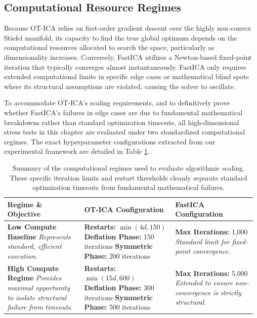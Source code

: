 \documentclass[12pt,a4paper,twoside,openany]{book}
\begin{document}
\subsection{Computational Resource Regimes}
Because OT-ICA relies on first-order gradient descent over the highly non-convex Stiefel manifold, its capacity to find 
the true global optimum depends on the computational resources allocated to search the space, particularly as dimensionality increases. 
Conversely, FastICA utilizes a Newton-based fixed-point iteration that typically converges almost instantaneously. 
FastICA only requires extended computational limits in specific edge cases or mathematical blind spots where its structural assumptions are violated, 
causing the solver to oscillate. 

To accommodate OT-ICA's scaling requirements, and to definitively prove whether FastICA's failures in edge cases are due 
to fundamental mathematical breakdowns rather than standard optimization timeouts, all high-dimensional stress tests in 
this chapter are evaluated under two standardized computational regimes. The exact hyperparameter configurations extracted 
from our experimental framework are detailed in Table \ref{tab:compute_regimes}.

\begin{table}[htbp]
    \centering
    \small
    \begin{tabular}{@{} p{4.0cm} p{5.5cm} p{4.5cm} @{}}
        \toprule
        \textbf{Regime \& Objective} & \textbf{OT-ICA Configuration} & \textbf{FastICA Configuration} \\
        \midrule
        \textbf{Low Compute Baseline} \newline \textit{Represents standard, efficient execution.} & 
        \textbf{Restarts:} $\min(4d, 150)$ \newline
        \textbf{Deflation Phase:} 150 iterations \newline
        \textbf{Symmetric Phase:} 200 iterations & 
        \textbf{Max Iterations:} 1,000 \newline 
        \textit{Standard limit for fixed-point convergence.} \\
        \addlinespace
        \addlinespace
        \textbf{High Compute Regime} \newline \textit{Provides maximal opportunity to isolate structural failure from timeouts.} & 
        \textbf{Restarts:} $\min(15d, 600)$ \newline
        \textbf{Deflation Phase:} 300 iterations \newline
        \textbf{Symmetric Phase:} 500 iterations & 
        \textbf{Max Iterations:} 5,000 \newline 
        \textit{Extended to ensure non-convergence is strictly structural.} \\
        \bottomrule
    \end{tabular}
    \caption[Standardized Computational Regimes]{Summary of the computational regimes used to evaluate algorithmic scaling. 
    These specific iteration limits and restart thresholds cleanly separate standard optimization timeouts from fundamental mathematical failures.}
    \label{tab:compute_regimes}
\end{table}
\end{document}

